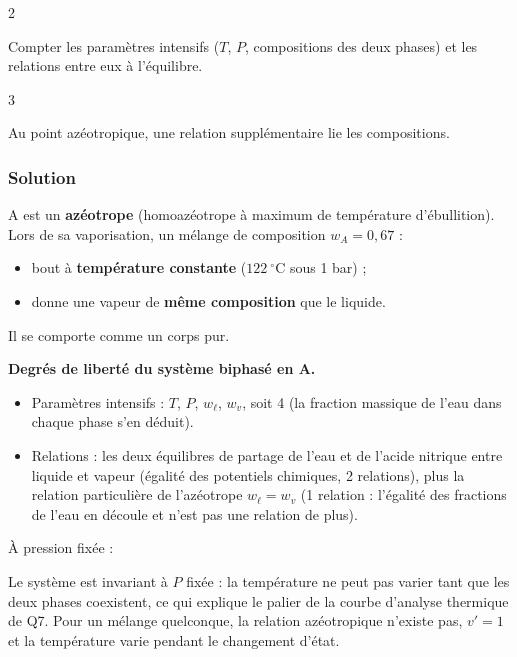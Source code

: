 \documentclass[11pt,a4paper]{article}
\providecommand{\tightlist}{\setlength{\itemsep}{0pt}\setlength{\parskip}{0pt}}
\newcommand{\equationajustee}[1]{%
  \sbox{\boiteequation}{$\displaystyle #1$}%
  \ifdim\wd\boiteequation>\linewidth
    \[\resizebox{\linewidth}{!}{\usebox{\boiteequation}}\]%
  \else
    \[#1\]%
  \fi}
\begin{document}
\begin{indication}{2}

Compter les paramètres intensifs (\(T\), \(P\), compositions des deux phases) et les relations entre eux à l'équilibre.

\end{indication}

\begin{indication}{3}

Au point azéotropique, une relation supplémentaire lie les compositions.

\end{indication}

\hypertarget{solution-7}{%
\subsubsection{Solution}\label{solution-7}}

A est un \textbf{azéotrope} (homoazéotrope à maximum de température d'ébullition). Lors de sa vaporisation, un mélange de composition \(w_A=0{,}67\) :

\begin{itemize}
\tightlist
\item
  bout à \textbf{température constante} (\(122\ ^\circ\)C sous 1 bar) ;
\item
  donne une vapeur de \textbf{même composition} que le liquide.
\end{itemize}

Il se comporte comme un corps pur.

\textbf{Degrés de liberté du système biphasé en A.}

\begin{itemize}
\tightlist
\item
  Paramètres intensifs : \(T\), \(P\), \(w_\ell\), \(w_v\), soit 4 (la fraction massique de l'eau dans chaque phase s'en déduit).
\item
  Relations : les deux équilibres de partage de l'eau et de l'acide nitrique entre liquide et vapeur (égalité des potentiels chimiques, 2 relations), plus la relation particulière de l'azéotrope \(w_\ell=w_v\) (1 relation : l'égalité des fractions de l'eau en découle et n'est pas une relation de plus).
\end{itemize}

\equationajustee{v=4-3=1}

À pression fixée :

\equationajustee{\boxed{v'=0}}

Le système est invariant à \(P\) fixée : la température ne peut pas varier tant que les deux phases coexistent, ce qui explique le palier de la courbe d'analyse thermique de Q7. Pour un mélange quelconque, la relation azéotropique n'existe pas, \(v'=1\) et la température varie pendant le changement d'état.
\end{document}
